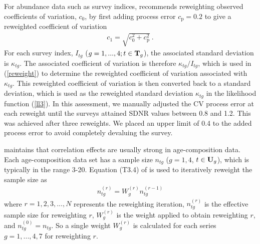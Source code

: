 \documentclass[11pt]{article}   %
\def\gcomm{7}                    %
\newcommand{\eref}[1]{(\ref{#1})}
\newcommand{\eb}{\begin{eqnarray}}
\newcommand{\ee}{\end{eqnarray}}
\begin{document}
For abundance data such as survey indices, \citet{fran11} recommends reweighting observed coefficients of variation, $c_0$, by first adding process error $c_\mathrm{p} = 0.2$ to give a reweighted coefficient of variation
\eb
c_1 = \sqrt{c_0^2 + c_\mathrm{p}^2}~.
\label{reweight}
\ee
For each survey index, $I_{tg}$ ($g=1,...,4; t \in {\bf T}_g$), the associated standard deviation is $\kappa_{tg}$. The associated coefficient of variation is therefore $\kappa_{tg} / I_{tg}$, which is used in \eref{reweight} to determine the reweighted coefficient of variation associated with $\kappa_{tg}$. This reweighted coefficient of variation is then converted back to a standard deviation, which is used as the reweighted standard deviation $\kappa_{tg}$ in the likelihood function \eref{ll3}. In this assessment, we manually adjusted the CV process error at each reweight until the surveys attained SDNR values between 0.8 and 1.2. This was achieved after three reweights. We placed an upper limit of 0.4 to the added process error to avoid completely devaluing the survey.


\citet{fran11} maintains that correlation effects are usually strong in age-composition data. Each age-composition data set has a sample size $n_{tg}$ ($g=1,4$, $t \in {\bf U}_g$), which is typically in the range 3-20. Equation (T3.4) of \citet{fran11} is used to iteratively reweight the sample size as
\eb
n_{tg}^{(r)} = W_{g}^{(r)} n_{tg}^{(r-1)}
\ee
where $r=1,2,3,...,N$ represents the reweighting iteration, $n_{tg}^{(r)}$ is the effective sample size for reweighting $r$, $W_{g}^{(r)}$ is the weight applied to obtain reweighting $r$, and $n_{tg}^{(0)} = n_{tg}$. So a single weight $W_{g}^{(r)}$ is calculated for each series $g=1,...,4,\gcomm$ for reweighting $r$.
\end{document}
